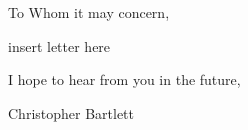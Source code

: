 \documentclass{resume} %
\begin{document}
\vspace{0.50 in}

To Whom it may concern,

\vspace{0.50 in}
\quad insert letter here

\vspace{0.50 in}

I hope to hear from you in the future, 


\quad Christopher Bartlett



\end{document}
